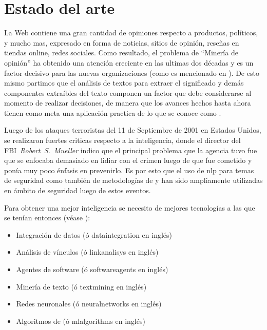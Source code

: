 \chapter{Estado del arte} %

\label{chStateOfTheArt} %



La Web contiene una gran cantidad de opiniones respecto a productos, políticos, y mucho mas, expresado en forma de noticias, sitios de opinión, reseñas en tiendas online, redes sociales. Como resultado, el problema de ``Minería de opinión'' ha obtenido una atención creciente en las ultimas dos décadas y es un factor decisivo para las nuevas organizaciones (como es mencionado en \cite{Popescu2007}). De esto mismo partimos que el análisis de textos para extraer el significado y demás componentes extraíbles del texto componen un factor que debe considerarse al momento de realizar decisiones, de manera que los avances hechos hasta ahora tienen como meta una aplicación practica de lo que se conoce como .

Luego de los ataques terroristas del 11 de Septiembre de 2001 en Estados Unidos, se realizaron fuertes criticas respecto a la inteligencia, donde el director del FBI~\emph{Robert~S.~Mueller} indico que el principal problema que la agencia tuvo fue que se enfocaba demasiado en lidiar con el crimen luego de que fue cometido y ponía muy poco énfasis en prevenirlo. Es por esto que el uso de \gls{nlp} para temas de seguridad como también de metodologías de  y  han sido ampliamente utilizadas en ámbito de seguridad luego de estos eventos.

Para obtener una mejor inteligencia se necesito de mejores tecnologías a las que se tenían entonces (véase \cite[p\'ag 2]{mena2003investigative}):
\begin{itemize}
\item Integración de datos (\'o \gls{dataintegration} en ingl\'es)
\item Análisis de vínculos (\'o \gls{linkanalisys} en ingl\'es)
\item Agentes de software (\'o \gls{softwareagents} en ingl\'es)
\item Minería de texto (\'o \gls{textmining} en ingl\'es)
\item Redes neuronales (\'o \gls{neuralnetworks} en ingl\'es)
\item Algoritmos de  (\'o \gls{mlalgorithms} en ingl\'es)
\end{itemize}


